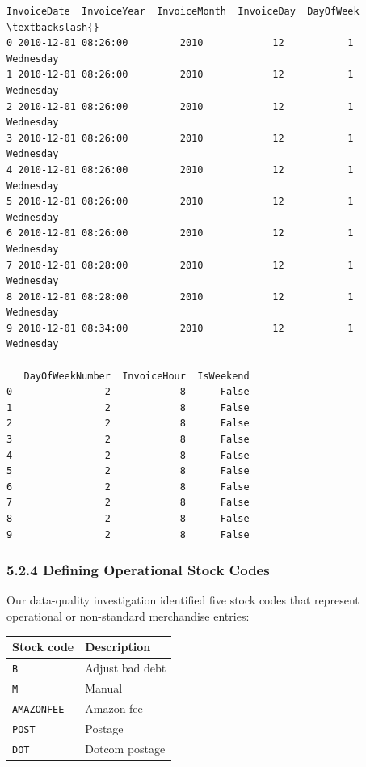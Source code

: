 \documentclass[11pt]{article}
\begin{document}
    
    \begin{Verbatim}[commandchars=\\\{\}]
          InvoiceDate  InvoiceYear  InvoiceMonth  InvoiceDay  DayOfWeek  \textbackslash{}
0 2010-12-01 08:26:00         2010            12           1  Wednesday   
1 2010-12-01 08:26:00         2010            12           1  Wednesday   
2 2010-12-01 08:26:00         2010            12           1  Wednesday   
3 2010-12-01 08:26:00         2010            12           1  Wednesday   
4 2010-12-01 08:26:00         2010            12           1  Wednesday   
5 2010-12-01 08:26:00         2010            12           1  Wednesday   
6 2010-12-01 08:26:00         2010            12           1  Wednesday   
7 2010-12-01 08:28:00         2010            12           1  Wednesday   
8 2010-12-01 08:28:00         2010            12           1  Wednesday   
9 2010-12-01 08:34:00         2010            12           1  Wednesday   

   DayOfWeekNumber  InvoiceHour  IsWeekend  
0                2            8      False  
1                2            8      False  
2                2            8      False  
3                2            8      False  
4                2            8      False  
5                2            8      False  
6                2            8      False  
7                2            8      False  
8                2            8      False  
9                2            8      False  
    \end{Verbatim}

    
    \subsubsection{5.2.4 Defining Operational Stock
Codes}\label{defining-operational-stock-codes}

Our data-quality investigation identified five stock codes that
represent operational or non-standard merchandise entries:

{\def\LTcaptype{none} %
\begin{longtable}[]{@{}ll@{}}
\toprule\noalign{}
Stock code & Description \\
\midrule\noalign{}
\endhead
\bottomrule\noalign{}
\endlastfoot
\texttt{B} & Adjust bad debt \\
\texttt{M} & Manual \\
\texttt{AMAZONFEE} & Amazon fee \\
\texttt{POST} & Postage \\
\texttt{DOT} & Dotcom postage \\
\end{longtable}
}
\end{document}
